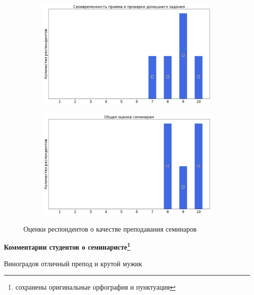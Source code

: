 \begin{figure}[H]
\begin{subfigure}[b]{0.45\textwidth}
                    \centering
                    \includegraphics[width=\textwidth]{images/3 course/Общая физика - квантовая физика/seminarists-marks-Виноградов С.В.-2.png}
                \end{subfigure}
                \begin{subfigure}[b]{0.45\textwidth}
                    \centering
                    \includegraphics[width=\textwidth]{images/3 course/Общая физика - квантовая физика/seminarists-marks-Виноградов С.В.-3.png}
                \end{subfigure}	
                \caption{Оценки респондентов о качестве преподавания семинаров}
            \end{figure}

            \textbf{Комментарии студентов о семинаристе\protect\footnote{сохранены оригинальные орфография и пунктуация}}
                \begin{commentbox} 
                    Виноградов отличный препод и крутой мужик 
                \end{commentbox} 
            
